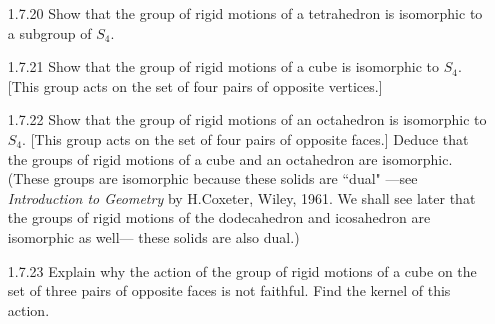 \begin{enumerate}
      \textbf{Proof.} Let $x \in G$ and let $\mathcal{O}$ be the orbit of $x$
      under the action of $H$ on $G$. Consider the map
      $\alpha : H \rightarrow \mathcal{O}$, $h \mapsto hx$. Suppose
      $\alpha(a) = \alpha(b)$. Then it follows that $ax = bx$, so that $a = b$,
      by cancellation. Thus $\alpha$ is injective. Since $G$ is finite, $H$
      must also be finite; thus $\alpha$ is necessarily surjective, and we 
      conclude that $\alpha$ is bijective. That is $|H| = |\mathcal{O}|$. Let
      $|G| = n$. By Exercise 1.7.18, the action of $H$ on $G$ partitions $G$
      into $m$ distinct orbits (there is a finite number of orbits because $G$
      is finite). Since $x$ was arbitrary, it follows that each orbit of this
      action has size $|H|$, so that $m\cdot|H| = |G|$. That is $|H| \mid |G|$.
      \qed
   \item[1.7.20]  Show that the group of rigid motions of a tetrahedron is
                  isomorphic to a subgroup of $S_4$.
   \item[1.7.21]  Show that the group of rigid motions of a cube is isomorphic
                  to $S_4$. [This group acts on the set of four pairs of
                  opposite vertices.]
   \item[1.7.22]  Show that the group of rigid motions of an octahedron is
                  isomorphic to $S_4$. [This group acts on the set
                  of four pairs of opposite faces.] Deduce that the groups of
                  rigid motions of a cube and an octahedron are isomorphic.
                  (These groups are isomorphic because these solids are ``dual"
                  ---see \textit{Introduction to Geometry} by H.Coxeter, Wiley,
                  1961. We shall see later that the groups of rigid motions of
                  the dodecahedron and icosahedron are isomorphic as well---
                  these solids are also dual.)
   \item[1.7.23]  Explain why the action of the group of rigid motions of a cube
                  on the set of three pairs of opposite faces is not faithful.
                  Find the kernel of this action.
\end{enumerate}
